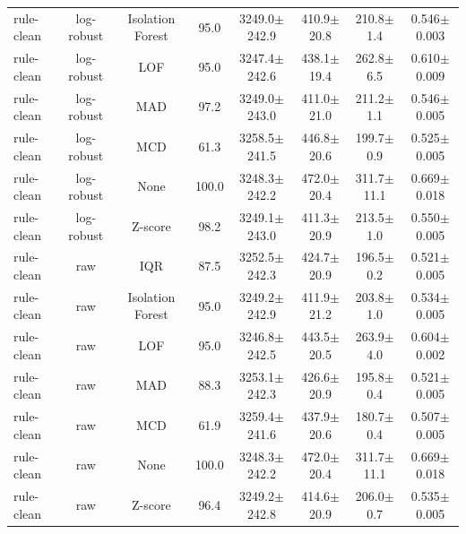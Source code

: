 \begin{table}[!t]
\begin{tabular}{lccccccc}
rule-clean & log-robust & Isolation Forest & 95.0 & 3249.0$\pm$242.9 & 410.9$\pm$20.8 & 210.8$\pm$1.4 & 0.546$\pm$0.003 \\
rule-clean & log-robust & LOF & 95.0 & 3247.4$\pm$242.6 & 438.1$\pm$19.4 & 262.8$\pm$6.5 & 0.610$\pm$0.009 \\
rule-clean & log-robust & MAD & 97.2 & 3249.0$\pm$243.0 & 411.0$\pm$21.0 & 211.2$\pm$1.1 & 0.546$\pm$0.005 \\
rule-clean & log-robust & MCD & 61.3 & 3258.5$\pm$241.5 & 446.8$\pm$20.6 & 199.7$\pm$0.9 & 0.525$\pm$0.005 \\
rule-clean & log-robust & None & 100.0 & 3248.3$\pm$242.2 & 472.0$\pm$20.4 & 311.7$\pm$11.1 & 0.669$\pm$0.018 \\
rule-clean & log-robust & Z-score & 98.2 & 3249.1$\pm$243.0 & 411.3$\pm$20.9 & 213.5$\pm$1.0 & 0.550$\pm$0.005 \\
rule-clean & raw & IQR & 87.5 & 3252.5$\pm$242.3 & 424.7$\pm$20.9 & 196.5$\pm$0.2 & 0.521$\pm$0.005 \\
rule-clean & raw & Isolation Forest & 95.0 & 3249.2$\pm$242.9 & 411.9$\pm$21.2 & 203.8$\pm$1.0 & 0.534$\pm$0.005 \\
rule-clean & raw & LOF & 95.0 & 3246.8$\pm$242.5 & 443.5$\pm$20.5 & 263.9$\pm$4.0 & 0.604$\pm$0.002 \\
rule-clean & raw & MAD & 88.3 & 3253.1$\pm$242.3 & 426.6$\pm$20.9 & 195.8$\pm$0.4 & 0.521$\pm$0.005 \\
rule-clean & raw & MCD & 61.9 & 3259.4$\pm$241.6 & 437.9$\pm$20.6 & 180.7$\pm$0.4 & 0.507$\pm$0.005 \\
rule-clean & raw & None & 100.0 & 3248.3$\pm$242.2 & 472.0$\pm$20.4 & 311.7$\pm$11.1 & 0.669$\pm$0.018 \\
rule-clean & raw & Z-score & 96.4 & 3249.2$\pm$242.8 & 414.6$\pm$20.9 & 206.0$\pm$0.7 & 0.535$\pm$0.005 \\
\hline
\end{tabular}
\end{table}